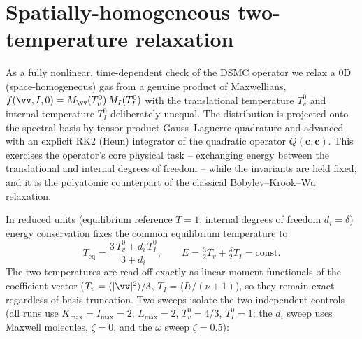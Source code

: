 \section{Spatially-homogeneous two-temperature relaxation}
\label{sec:relax}

As a fully nonlinear, time-dependent check of the DSMC operator we relax a $0$D (space-homogeneous)
gas from a genuine product of Maxwellians, $f(\vv,I,0)=M_{\vv}(T_v^0)\,M_I(T_I^0)$ with the
translational temperature $T_v^0$ and internal temperature $T_I^0$ deliberately unequal. The
distribution is projected onto the spectral basis by tensor-product Gauss--Laguerre quadrature and
advanced with an explicit RK2 (Heun) integrator of the quadratic operator $Q(\bm{c},\bm{c})$. This
exercises the operator's core physical task -- exchanging energy between the translational and
internal degrees of freedom -- while the invariants are held fixed, and it is the polyatomic
counterpart of the classical Bobylev--Krook--Wu relaxation.

In reduced units (equilibrium reference $T=1$, internal degrees of freedom $d_i=\delta$) energy
conservation fixes the common equilibrium temperature to
\begin{equation}
  T_{\mathrm{eq}}=\frac{3\,T_v^0+d_i\,T_I^0}{3+d_i},
  \qquad
  E=\tfrac32 T_v+\tfrac{\delta}{2}T_I=\text{const}.
  \label{eq:Teq}
\end{equation}
The two temperatures are read off exactly as linear moment functionals of the coefficient vector
($T_v=\langle|\vv|^2\rangle/3$, $T_I=\langle I\rangle/(\nu+1)$), so they remain exact regardless of
basis truncation. Two sweeps isolate the two independent controls (all runs use
$K_{\max}=I_{\max}=2$, $L_{\max}=2$, $T_v^0=4/3$, $T_I^0=1$; the $d_i$ sweep uses Maxwell
molecules, $\zeta=0$, and the $\omega$ sweep $\zeta=0.5$):


